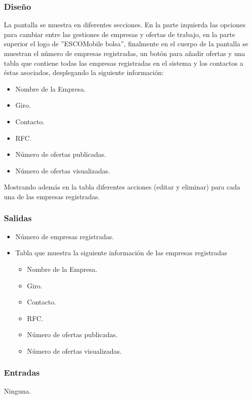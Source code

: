 \subsubsection{Diseño}
	\noindent
	La pantalla se muestra en diferentes secciones. En la parte izquierda las opciones para cambiar entre las gestiones de empresas y ofertas de trabajo, en la parte superior el logo de ''ESCOMobile bolsa'', finalmente en el cuerpo de la pantalla se muestran el número de empresas registradas, un botón para añadir ofertas y una tabla que contiene todas las empresas registradas en el sistema y los contactos a éstas asociados, desplegando la siguiente información:
	\begin{itemize}
		\item Nombre de la Empresa.
		\item Giro.
		\item Contacto.
		\item RFC.
		\item Número de ofertas publicadas.
		\item Número de ofertas visualizadas. 
	\end{itemize}
	Mostrando además en la tabla diferentes acciones (editar y eliminar) para cada una de las empresas registradas.


\subsubsection{Salidas}
	\begin{itemize}
		\item Número de empresas registradas.
		\item Tabla que muestra la siguiente información de las empresas registradas
		\begin{itemize}
			\item Nombre de la Empresa.
			\item Giro.
			\item Contacto.
			\item RFC.
			\item Número de ofertas publicadas.
			\item Número de ofertas visualizadas. 
		\end{itemize}
	\end{itemize}

\subsubsection{Entradas}
	\noindent
	Ninguna.


